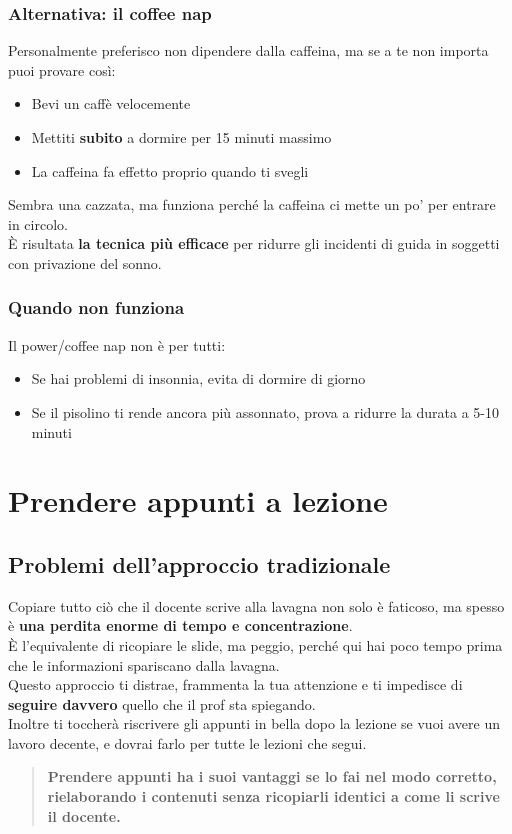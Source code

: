 \documentclass[18pt]{extarticle}
\begin{document}
\subsubsection{Alternativa: il coffee nap}
Personalmente preferisco non dipendere dalla caffeina, ma se a te non importa puoi provare così:
\begin{itemize}
\item Bevi un caffè velocemente
\item Mettiti \textbf{subito} a dormire per 15 minuti massimo
\item La caffeina fa effetto proprio quando ti svegli
\end{itemize}
Sembra una cazzata, ma funziona perché la caffeina ci mette un po' per entrare in circolo.\\
È risultata \textbf{la tecnica più efficace} per ridurre gli incidenti di guida in soggetti con privazione del sonno.


\subsubsection{Quando non funziona}
Il power/coffee nap non è per tutti:
\begin{itemize}
\item Se hai problemi di insonnia, evita di dormire di giorno
\item Se il pisolino ti rende ancora più assonnato, prova a ridurre la durata a 5-10 minuti
\end{itemize}


\section{Prendere appunti a lezione}
\subsection{Problemi dell'approccio tradizionale}
Copiare tutto ciò che il docente scrive alla lavagna non solo è faticoso, ma spesso è \textbf{una perdita enorme di tempo e concentrazione}.\\
È l'equivalente di ricopiare le slide, ma peggio, perché qui hai poco tempo prima che le informazioni spariscano dalla lavagna.\\
Questo approccio ti distrae, frammenta la tua attenzione e ti impedisce di \textbf{seguire davvero} quello che il prof sta spiegando.\\
Inoltre ti toccherà riscrivere gli appunti in bella dopo la lezione se vuoi avere un lavoro decente, e dovrai farlo per tutte le lezioni che segui.
\begin{quote}
\textbf{Prendere appunti ha i suoi vantaggi se lo fai nel modo corretto, rielaborando i contenuti senza ricopiarli identici a come li scrive il docente.}
\end{quote}
\end{document}
